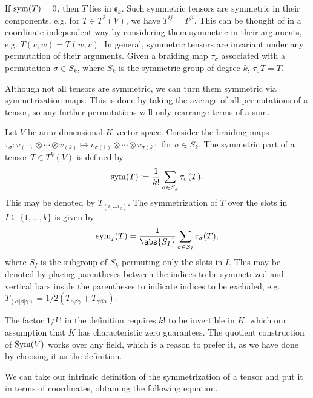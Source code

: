 \documentclass[a4paper,12pt]{article}
\begin{document}
If $\operatorname{sym}(T) = 0$, then $T$ lies in $\mathfrak{s}_k$.
Such symmetric tensors are symmetric in their components, e.g. for $T \in T^2(V)$, we have $T^{ij} = T^{ji}$.
This can be thought of in a coordinate-independent way by considering them symmetric in their arguments, e.g. $T(v, w) = T(w, v)$.
In general, symmetric tensors are invariant under any permutation of their arguments.
Given a braiding map $\tau_\sigma$ associated with a permutation $\sigma \in S_k$, where $S_k$ is the symmetric group of degree $k$, $\tau_\sigma T = T$.

Although not all tensors are symmetric, we can turn them symmetric via symmetrization maps.
This is done by taking the average of all permutations of a tensor, so any further permutations will only rearrange terms of a sum.
\begin{definition}\label{def:tensor_symmetrization}
    Let $V$ be an $n$-dimensional $K$-vector space.
    Consider the braiding maps $\tau_\sigma \colon v_{(1)} \otimes \cdots \otimes v_{(k)} \mapsto v_{\sigma(1)} \otimes \cdots \otimes v_{\sigma(k)}$ for $\sigma \in S_k$.
    The symmetric part of a tensor $T \in T^k(V)$ is defined by
    \begin{equation}
        \operatorname{sym}(T) \coloneq \frac{1}{k!} \sum_{\sigma \in S_k} \tau_\sigma(T).
    \end{equation}
    This may be denoted by $T_{(i_1 \ldots i_k)}$.
    The symmetrization of $T$ over the slots in $I \subseteq \{1, \ldots, k\}$ is given by
    \begin{equation}
        \sym_I(T) = \frac{1}{\abs{S_I}} \sum_{\sigma \in S_I} \tau_\sigma(T),
    \end{equation}
    where $S_I$ is the subgroup of $S_k$ permuting only the slots in $I$.
    This may be denoted by placing parentheses between the indices to be symmetrized and vertical bars inside the parentheses to indicate indices to be excluded, e.g. $T_{(\alpha \lvert\beta\rvert \gamma)} = 1/2 (T_{\alpha \beta \gamma} + T_{\gamma \beta \alpha})$.
\end{definition}
\begin{remark}
    The factor $1/k!$ in the definition requires $k!$ to be invertible in $K$, which our assumption that $K$ has characteristic zero guarantees.
    The quotient construction of $\operatorname{Sym}(V)$ works over any field, which is a reason to prefer it, as we have done by choosing it as the definition.
\end{remark}
We can take our intrinsic definition of the symmetrization of a tensor and put it in terms of coordinates, obtaining the following equation.
\end{document}
